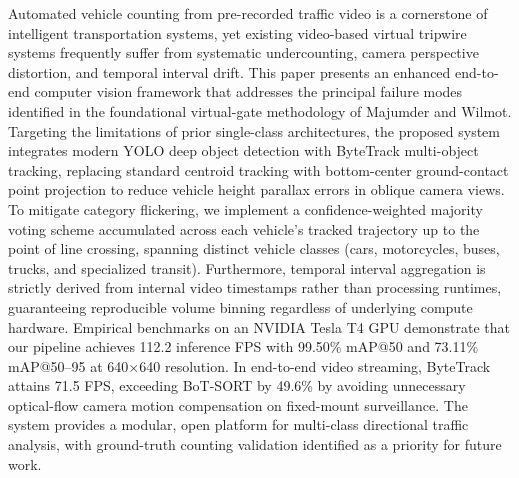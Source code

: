 Automated vehicle counting from pre-recorded traffic video is a cornerstone of intelligent transportation systems, yet existing video-based virtual tripwire systems frequently suffer from systematic undercounting, camera perspective distortion, and temporal interval drift. This paper presents an enhanced end-to-end computer vision framework that addresses the principal failure modes identified in the foundational virtual-gate methodology of Majumder and Wilmot. Targeting the limitations of prior single-class architectures, the proposed system integrates modern YOLO deep object detection with ByteTrack multi-object tracking, replacing standard centroid tracking with bottom-center ground-contact point projection to reduce vehicle height parallax errors in oblique camera views. To mitigate category flickering, we implement a confidence-weighted majority voting scheme accumulated across each vehicle's tracked trajectory up to the point of line crossing, spanning distinct vehicle classes (cars, motorcycles, buses, trucks, and specialized transit). Furthermore, temporal interval aggregation is strictly derived from internal video timestamps rather than processing runtimes, guaranteeing reproducible volume binning regardless of underlying compute hardware. Empirical benchmarks on an NVIDIA Tesla T4 GPU demonstrate that our pipeline achieves 112.2 inference FPS with 99.50\% mAP@50 and 73.11\% mAP@50--95 at 640$\times$640 resolution. In end-to-end video streaming, ByteTrack attains 71.5 FPS, exceeding BoT-SORT by 49.6\% by avoiding unnecessary optical-flow camera motion compensation on fixed-mount surveillance. The system provides a modular, open platform for multi-class directional traffic analysis, with ground-truth counting validation identified as a priority for future work.
